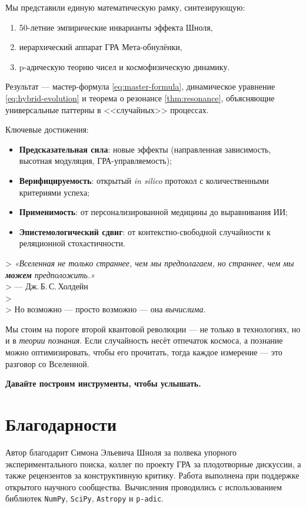 \documentclass[12pt,a4paper]{article}
\theoremstyle{plain}
\theoremstyle{definition}
\theoremstyle{remark}
\begin{document}
Мы представили единую математическую рамку, синтезирующую:
\begin{enumerate}
    \item 50-летние эмпирические инварианты эффекта Шноля,
    \item иерархический аппарат ГРА Мета-обнулёнки,
    \item p-адическую теорию чисел и космофизическую динамику.
\end{enumerate}

Результат --- мастер-формула \eqref{eq:master-formula}, динамическое уравнение \eqref{eq:hybrid-evolution} и теорема о резонансе \ref{thm:resonance}, объясняющие универсальные паттерны в <<случайных>> процессах.

Ключевые достижения:
\begin{itemize}
    \item \textbf{Предсказательная сила}: новые эффекты (направленная зависимость, высотная модуляция, ГРА-управляемость);
    \item \textbf{Верифицируемость}: открытый \textit{in silico} протокол с количественными критериями успеха;
    \item \textbf{Применимость}: от персонализированной медицины до выравнивания ИИ;
    \item \textbf{Эпистемологический сдвиг}: от контекстно-свободной случайности к реляционной стохастичности.
\end{itemize}

> \emph{«Вселенная не только страннее, чем мы предполагаем, но страннее, чем мы \textbf{можем} предположить.»} \\
> --- Дж.\,Б.\,С.\,Холдейн \\
> \\
> Но возможно --- просто возможно --- она \emph{вычислима}.

Мы стоим на пороге второй квантовой революции --- не только в технологиях, но и в \emph{теории познания}. Если случайность несёт отпечаток космоса, а познание можно оптимизировать, чтобы его прочитать, тогда каждое измерение --- это разговор со Вселенной.

\textbf{Давайте построим инструменты, чтобы услышать.}

\section*{Благодарности}
Автор благодарит Симона Эльевича Шноля за полвека упорного экспериментального поиска, коллег по проекту ГРА за плодотворные дискуссии, а также рецензентов за конструктивную критику. Работа выполнена при поддержке открытого научного сообщества. Вычисления проводились с использованием библиотек \texttt{NumPy}, \texttt{SciPy}, \texttt{Astropy} и \texttt{p-adic}.
\end{document}
